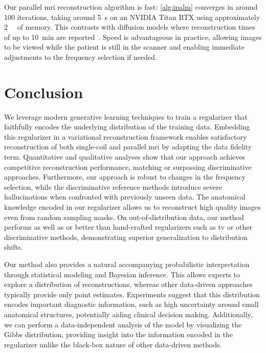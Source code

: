 Our parallel \gls{mri} reconstruction algorithm is fast:
\cref{alg:ipalm} converges in around \num{100} iterations, taking around \qty{5}{\second} on an NVIDIA Titan RTX using approximately \qty{2}{\giga\byte} of memory.
This contrasts with diffusion models where reconstruction times of up to \qty{10}{\minute} are reported~\cite{chung_scoremri_2022}.
Speed is advantageous in practice, allowing images to be viewed while the patient is still in the scanner and enabling immediate adjustments to the frequency selection if needed.

\section{Conclusion}%
\label{sec:conclusion deep neural regularizer}
We leverage modern generative learning techniques to train a regularizer that faithfully encodes the underlying distribution of the training data.
Embedding this regularizer in a variational reconstruction framework enables satisfactory reconstruction of both single-coil and parallel \gls{mri} by adapting the data fidelity term.
Quantitative and qualitative analyses show that our approach achieves competitive reconstruction performance, matching or surpassing discriminative approaches.
Furthermore, our approach is robust to changes in the frequency selection, while the discriminative reference methods introduce severe hallucinations when confronted with previously unseen data.
The anatomical knowledge encoded in our regularizer allows us to reconstruct high quality images even from random sampling masks.
On out-of-distribution data, our method performs as well as or better than hand-crafted regularizers such as \gls{tv} or other discriminative methods, demonstrating superior generalization to distribution shifts.

Our method also provides a natural accompanying probabilistic interpretation through statistical modeling and Bayesian inference.
This allows experts to explore a distribution of reconstructions, whereas other data-driven approaches typically provide only point estimates.
Experiments suggest that this distribution encodes important diagnostic information, such as high uncertainty around small anatomical structures, potentially aiding clinical decision making.
Additionally, we can perform a data-independent analysis of the model by visualizing the Gibbs distribution, providing insight into the information encoded in the regularizer unlike the black-box nature of other data-driven methods.

